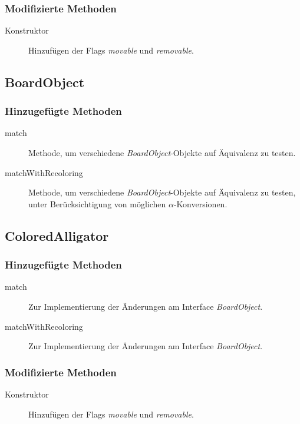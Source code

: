 \subsubsection{Modifizierte Methoden}
\begin{description}
\item[Konstruktor]
Hinzufügen der Flags \emph{movable} und \emph{removable}.
\end{description}


\subsection{BoardObject}

\subsubsection{Hinzugefügte Methoden}
\begin{description}
\item[match]
Methode, um verschiedene \emph{BoardObject}-Objekte auf Äquivalenz zu testen.
\item[matchWithRecoloring]
Methode, um verschiedene \emph{BoardObject}-Objekte auf Äquivalenz zu testen, unter Berücksichtigung von möglichen \(\alpha\)-Konversionen.
\end{description}


\subsection{ColoredAlligator}

\subsubsection{Hinzugefügte Methoden}
\begin{description}
\item[match]
Zur Implementierung der Änderungen am Interface \emph{BoardObject}.
\item[matchWithRecoloring]
Zur Implementierung der Änderungen am Interface \emph{BoardObject}.
\end{description}

\subsubsection{Modifizierte Methoden}
\begin{description}
\item[Konstruktor]
Hinzufügen der Flags \emph{movable} und \emph{removable}.
\end{description}


